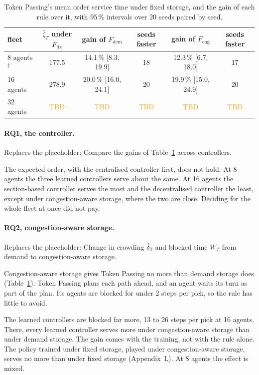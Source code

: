 \documentclass[11pt,a4paper]{article}
\newcommand{\placeholder}[1]{\textcolor{plc}{\small Replaces the placeholder: #1}\par}
\newcommand{\tbd}{\textcolor{orange}{TBD}}
\begin{document}
\begin{table}[H]
  \centering
  \caption{Token Passing's mean order service time under fixed storage, and the gain of each rule
    over it, with 95\,\% intervals over 20 seeds paired by seed.}
  \label{tab:gain}
  \small
  \begin{tabular}{l c cc cc}
    \toprule
    fleet & $\bar\zeta_T$ under $F_{\mathrm{fix}}$ & gain of $F_{\mathrm{dem}}$ & seeds faster
      & gain of $F_{\mathrm{cng}}$ & seeds faster \\
    \midrule
    8 agents$^\dagger$  & 177.5 & 14.1\,\% [8.3, 19.9]  & 18 & 12.3\,\% [6.7, 18.0]  & 17 \\
    16 agents           & 278.9 & 20.0\,\% [16.0, 24.1] & 20 & 19.9\,\% [15.0, 24.9] & 20 \\
    32 agents           & \tbd & \tbd & \tbd & \tbd & \tbd \\
    \bottomrule
  \end{tabular}
\end{table}

\paragraph{RQ1, the controller.}
\placeholder{Compare the gains of Table~\ref{tab:gain} across controllers.}
The expected order, with the centralised controller first, does not hold. At 8 agents the three
learned controllers serve about the same. At 16 agents the section-based controller serves the
most and the decentralised controller the least, except under congestion-aware storage, where the
two are close. Deciding for the whole fleet at once did not pay.

\paragraph{RQ2, congestion-aware storage.}
\placeholder{Change in crowding $\bar\delta_T$ and blocked time $W_T$ from demand to congestion-aware
storage.}
Congestion-aware storage gives Token Passing no more than demand storage does
(Table~\ref{tab:gain}). Token Passing plans each path ahead, and an agent waits its turn as part of
the plan. Its agents are blocked for under 2 steps per pick, so the rule has little to avoid.

The learned controllers are blocked far more, 13 to 26 steps per pick at 16 agents. There, every
learned controller serves more under congestion-aware storage than under demand storage. The gain
comes with the training, not with the rule alone. The policy trained under fixed storage, played
under congestion-aware storage, serves no more than under fixed storage (Appendix~L). At 8 agents
the effect is mixed.
\end{document}
